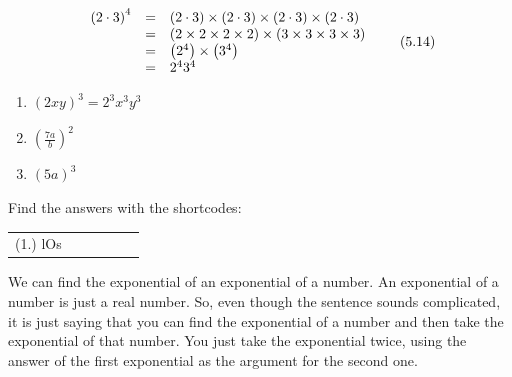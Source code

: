     \begin{equation}
    \begin{array}{ccc}\hfill {\left(2\ensuremath{\cdot}3\right)}^{4}& =& \left(2\ensuremath{\cdot}3\right)\ensuremath{\times}\left(2\ensuremath{\cdot}3\right)\ensuremath{\times}\left(2\ensuremath{\cdot}3\right)\ensuremath{\times}\left(2\ensuremath{\cdot}3\right)\hfill \\ & =& \left(2\ensuremath{\times}2\ensuremath{\times}2\ensuremath{\times}2\right)\ensuremath{\times}\left(3\ensuremath{\times}3\ensuremath{\times}3\ensuremath{\times}3\right)\hfill \\ & =& \left({2}^{4}\right)\ensuremath{\times}\left({3}^{4}\right)\hfill \\ & =& {2}^{4}{3}^{4}\hfill \end{array}\tag{5.14}
      \end{equation}
\label{m38359*secfhsst!!!underscore!!!id1581}
            \nopagebreak
        \label{m38359*id66288}\begin{enumerate}[noitemsep, label=\textbf{\arabic*}. ] 
            \label{m38359*uid31}\item 
            ${\left(2xy\right)}^{3}={2}^{3}{x}^{3}{y}^{3}$
      \label{m38359*uid32}\item 
        ${\left(\frac{7a}{b}\right)}^{2}$
      \label{m38359*uid33}\item 
        ${\left(5a\right)}^{3}$
\newline
\newline
          \end{enumerate}
      \label{m38359*uid34}
\par {} Find the answers with the shortcodes:
 \par \begin{tabular}[h]{cccccc}
 (1.) lOs  & \end{tabular}
            \nopagebreak
        \label{m38359*id66531}We can find the exponential of an exponential of a number. An exponential of a number is just a real number. So, even though the sentence sounds complicated, it is just saying that you can find the exponential of a number and then take the exponential of that number. You just take the exponential twice, using the answer of the first exponential as the argument for the second one.\par 
